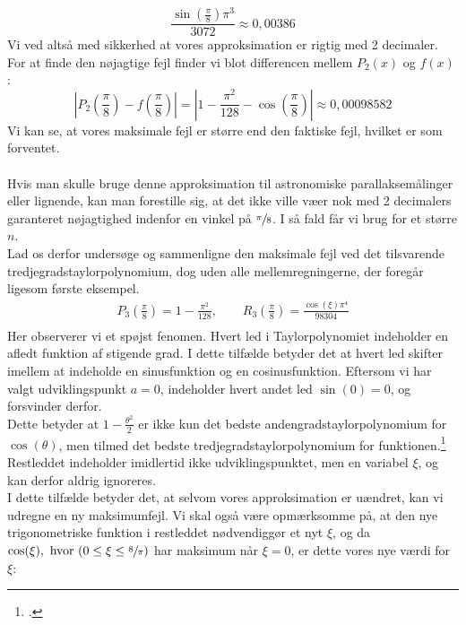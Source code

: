 \documentclass[12pt, a4paper]{article}
\begin{document}
\begin{refsection}
\begin{equation*}
    \frac{\sin\left(\frac{\pi}{8}\right)\pi^3}{3072}\approx 0{,}00386
\end{equation*}
Vi ved altså med sikkerhed at vores approksimation er rigtig med 2 decimaler.\\
For at finde den nøjagtige fejl finder vi blot differencen mellem $P_2(x)$ og $f(x)$ :
\begin{equation}\label{faktiskfejl}
    \left|P_2\left(\frac{\pi}{8}\right)-f\left(\frac{\pi}{8}\right)\right|=\left|1-\frac{\pi^2}{128}-\cos\left(\frac{\pi}{8} \right)   \right|\approx 0{,}00098582
\end{equation}
Vi kan se, at vores maksimale fejl er større end den faktiske fejl, hvilket er som forventet.\\
\\
Hvis man skulle bruge denne approksimation til astronomiske parallaksemålinger eller lignende, kan man forestille sig, at det ikke ville væer nok med 2 decimalers garanteret nøjagtighed indenfor en vinkel på $\sfrac{\pi}{8}$. I så fald får vi brug for et større $n$.\\
Lad os derfor undersøge og sammenligne den maksimale fejl ved det tilsvarende tredjegradstaylorpolynomium, dog uden alle mellemregningerne, der foregår ligesom første eksempel.
    \begin{align*}
        P_3\left(\frac{\pi}{8}\right)=1-\frac{\pi^2}{128}, \quad \quad R_3\left(\frac{\pi}{8}\right)=\frac{\cos(\xi)\pi^4}{98304}\\
    \end{align*}
    Her observerer vi et spøjst fenomen. Hvert led i Taylorpolynomiet indeholder en afledt funktion af stigende grad. I dette tilfælde betyder det at hvert led skifter imellem at indeholde en sinusfunktion og en cosinusfunktion. Eftersom vi har valgt udviklingspunkt $a=0$, indeholder hvert andet led $\sin(0)=0$, og forsvinder derfor.\\
    Dette betyder at  $1-\frac{\theta^2}{2}$ er ikke kun det bedste andengradstaylorpolynomium for $\cos(\theta)$, men tilmed det bedste tredjegradstaylorpolynomium for funktionen.\footcite{3blue1browntaylor}\\
    Restleddet indeholder imidlertid ikke udviklingspunktet, men en variabel  $\xi$, og kan derfor aldrig ignoreres.\\
    I dette tilfælde betyder det, at selvom vores approksimation er uændret, kan vi udregne en ny maksimumfejl. Vi skal også være opmærksomme på, at den nye trigonometriske funktion i restleddet nødvendiggør et nyt $\xi$, og da  $\cos(\xi), \text{ hvor }(0\leq \xi \leq \sfrac{8}{\pi})$ har maksimum når $\xi=0$, er dette vores nye værdi for $\xi$:

\end{refsection}
\end{document}
